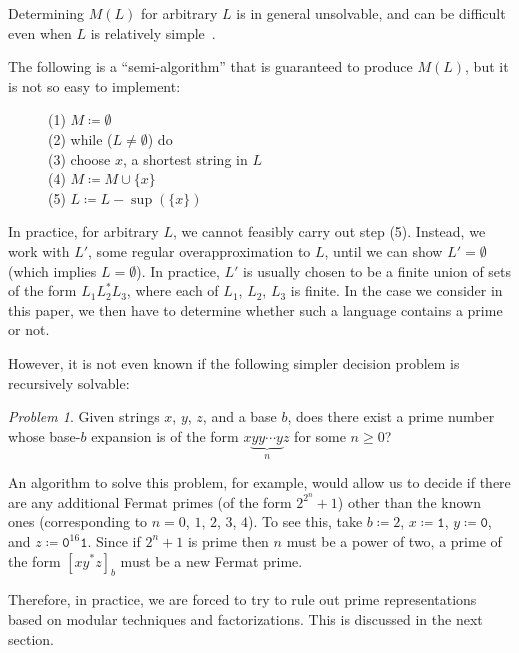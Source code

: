 \documentclass[12pt]{article}
\DeclareMathOperator\supe{sup}
\theoremstyle{plain}
\theoremstyle{definition}
\theoremstyle{remark}
\newtheorem{problem}[theorem]{Problem}
\newcommand{\0}{\mathtt{0}}
\newcommand{\1}{\mathtt{1}}
\newcommand{\2}{\mathtt{2}}
\newcommand{\3}{\mathtt{3}}
\newcommand{\4}{\mathtt{4}}
\newcommand{\5}{\mathtt{5}}
\newcommand{\6}{\mathtt{6}}
\newcommand{\7}{\mathtt{7}}
\newcommand{\8}{\mathtt{8}}
\newcommand{\9}{\mathtt{9}}
\newcommand{\union}{\cup}
\begin{document}
Determining $M(L)$ for arbitrary $L$
is in general unsolvable, and can be difficult even when $L$
is relatively simple~\cite{GHK07}.

The following is a ``semi-algorithm'' that 
is guaranteed to produce $M(L)$, but it is not so easy to implement:

\begin{figure}[H]
(1) $ M \coloneqq \emptyset$ \\
(2) while ($L \not= \emptyset$) do \\
\hphantom{} \qquad (3) choose $x$, a shortest string in $L$ \\
\hphantom{} \qquad (4) $ M \coloneqq M \union \lbrace  x \rbrace$ \\
\hphantom{} \qquad (5) $ L \coloneqq L - \supe(\lbrace x \rbrace) $
\end{figure}

In practice, for arbitrary $L$,
we cannot feasibly carry out step (5).  Instead, we work
with $L'$, some regular overapproximation to $L$, until we can show $L' =
\emptyset$ (which implies $L = \emptyset$).  In practice,
$L'$ is usually chosen to be a finite union of sets of the form 
$L_1 L_2^* L_3$, where each of $L_1$, $L_2$, $L_3$ is finite.
In the case we consider in this paper,
we then have to determine whether such a language contains
a prime or not.

However, it is not even known if the following simpler decision problem is 
recursively solvable:

\medskip

\begin{problem}
Given strings $x$, $y$, $z$, and a base $b$, does there exist a prime
number whose base-$b$ expansion is of the form $x \underbrace{yy\cdots y}_n z$
for some $n \geq 0$?
\end{problem}

\medskip

An algorithm to solve this problem, for example, would allow us to decide
if there are any additional Fermat primes (of the form $2^{2^n}+1$)
other than the known ones (corresponding to $n = 0$, $1$, $2$, $3$, $4$).
To see this, take $b\coloneqq2$, $x\coloneqq\1$, $y\coloneqq\0$, and $z\coloneqq\0^{16}\1$.
Since if $2^n+1$ is prime then $n$ must be a power of two, a prime of the
form $[xy^*z]_b$ must be a new Fermat prime.

Therefore, in practice, we are forced to try to rule out prime
representations based on modular techniques and factorizations.
This is discussed in the next section.
\end{document}
